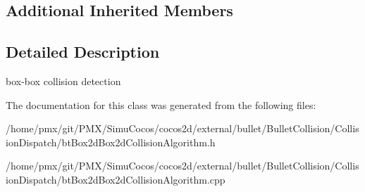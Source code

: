 \subsection*{Additional Inherited Members}


\subsection{Detailed Description}
box-\/box collision detection 

The documentation for this class was generated from the following files\+:\begin{DoxyCompactItemize}
\item 
/home/pmx/git/\+P\+M\+X/\+Simu\+Cocos/cocos2d/external/bullet/\+Bullet\+Collision/\+Collision\+Dispatch/bt\+Box2d\+Box2d\+Collision\+Algorithm.\+h\item 
/home/pmx/git/\+P\+M\+X/\+Simu\+Cocos/cocos2d/external/bullet/\+Bullet\+Collision/\+Collision\+Dispatch/bt\+Box2d\+Box2d\+Collision\+Algorithm.\+cpp\end{DoxyCompactItemize}
